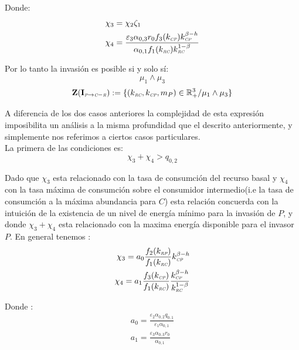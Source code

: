 Donde:
\begin{equation}
  \begin{aligned}
    \chi_3 &= \chi_2 \zeta_1 \\
    \chi_4 &= \frac{\varepsilon_3 \alpha_{0,3}r_0 f_3(k_{\textit{\tiny CP}})k_{\textit{\tiny CP}}^{\beta - h}}{\alpha_{0,1}f_1(k_{\textit{\tiny RC}})k_{\textit{\tiny RC}}^{1-\beta}}
  \end{aligned}
\end{equation}

Por lo tanto la invasi\'on es posible si y solo s\'i:
\begin{equation}
  \mu_1 \land \mu_3
\end{equation}
\begin{equation}
\mathbf{Z(I_{\textit{\tiny P} \to \textit{\tiny C}-\textit{\tiny R}})} := \{ (k_{\textit{\tiny RC}},k_{\textit{\tiny CP}},m_P) \in \mathbb{R}^3_+ / \mu_1 \land \mu_3 \}
\end{equation}

A diferencia de los dos casos anteriores la complejidad de esta expresi\'on imposibilita un an\'alisis a la misma profundidad que el descrito anteriormente, y simplemente nos referimos a ciertos casos particulares.\\

La primera de las condiciones es:
\begin{equation}
  \chi_3 + \chi_4 > q_{0,2}
\end{equation}

Dado que $\chi_3$ esta relacionado con la tasa de consumci\'on del recurso basal y $\chi_4$ con la tasa m\'axima de consumci\'on sobre el consumidor intermedio(i.e la tasa de consumci\'on a la m\'axima abundancia para $C$) esta relaci\'on concuerda con la intuici\'on de la existencia de un nivel de energ\'ia m\'inimo para la invasi\'on de $P$, y donde $\chi_3 + \chi_4$ esta relacionado con la maxima energ\'ia disponible para el invasor $P$.
En general tenemos :
\begin{equation}
  \begin{aligned}
    \chi_3 = a_0 \frac{f_2(k_{\textit{\tiny RP}})}{f_1(k_{\textit{\tiny RC}})} k_{\textit{\tiny CP}}^{\beta-h} \\
    \chi_4 = a_1 \frac{f_3(k_{\textit{\tiny CP}})}{f_1(k_{\textit{\tiny RC}})} \frac{k_{\textit{\tiny CP}}^{\beta - h}}{k_{\textit{\tiny RC}}^{1-\beta}}
  \end{aligned}
\end{equation}

Donde :
\begin{equation}
  \begin{aligned}
    a_0 = \frac{\varepsilon_2 \alpha_{0,2} q_{0,1}}{\varepsilon_1 \alpha_{0,1}} \\
    a_1 = \frac{\varepsilon_3 \alpha_{0,3} r_0}{\alpha_{0,1}}
  \end{aligned}
\end{equation}

